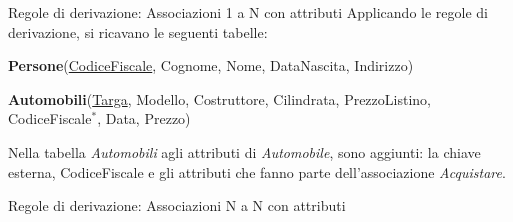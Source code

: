 \begin{frame}{Regole di derivazione: Associazioni 1 a N con attributi}
Applicando le regole di derivazione, si ricavano le seguenti tabelle:

\pause

\textbf{Persone}(\underline{CodiceFiscale}, Cognome, Nome, DataNascita, Indirizzo)
\pause

\textbf{Automobili}(\underline{Targa}, Modello, Costruttore, Cilindrata, PrezzoListino, CodiceFiscale$^*$, Data, Prezzo)

\pause
\vspace{.1cm}

Nella tabella \textit{Automobili} agli attributi di \textit{Automobile}, sono aggiunti: la chiave esterna, CodiceFiscale e gli attributi che fanno parte dell'associazione \textit{Acquistare}.
\end{frame}
%
\begin{frame}{Regole di derivazione: Associazioni N a N con attributi}
\begin{center}
\end{center}
\end{frame}
